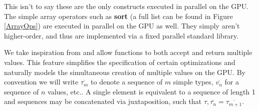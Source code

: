 \documentclass[preprint]{sigplanconf}
\begin{document}
This isn't to say these are the only constructs executed in parallel on the
GPU. The simple array operators such as \textbf{sort} (a full list can be found
in Figure \ref{ArrayOps}) are executed in parallel on the GPU as well. They
simply aren't higher-order, and thus are implemented via a fixed parallel
standard library.

We take inspiration from \cite{Bol09} and allow functions to both accept and
return multiple values. This feature simplifies the specification of certain
optimizations and naturally models the simultaneous creation of multiple values
on the GPU. By convention we will write $\overline{\tau_m}$ to denote a sequence
of $m$ simple types, $\overline{v_n}$ for a sequence  of $n$ values, etc.. A
single element is equivalent to a sequence of length 1 and sequences may be
concatenated via juxtaposition, such that $\tau, \overline{\tau_n} =
\overline{\tau_{m+1}}$.
\end{document}
